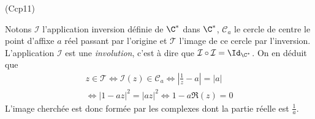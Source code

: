 \begin{tiny}(Ccp11)\end{tiny} \label{Ccp11} Notons $\mathcal{I}$ l'application inversion définie de $\C^*$ dans $\C^*$, $\mathcal{C}_a$ le cercle de centre le point d'affixe $a$ réel passant par l'origine et $\mathcal{T}$ l'image de ce cercle par l'inversion.\newline
L'application $\mathcal{I}$ est une \emph{involution}, c'est à dire que $\mathcal{I} \circ \mathcal{I} = \Id_{\C^*}$. On en déduit que
\begin{multline*}
  z\in \mathcal{T} \Leftrightarrow \mathcal{I}(z) \in \mathcal{C}_a
  \Leftrightarrow \left|\frac{1}{z} - a\right| = |a| \\
  \Leftrightarrow\left|1-az\right|^2 = \left|az\right|^2
  \Leftrightarrow 1-a\Re(z) = 0
\end{multline*}
L'image cherchée est donc formée par les complexes dont la partie réelle est $\frac{1}{a}$.
